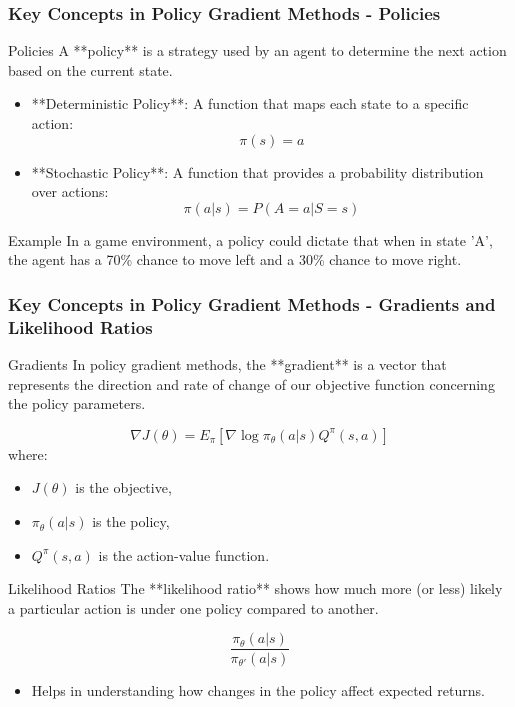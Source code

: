 \documentclass[aspectratio=169]{beamer}
\begin{document}
\begin{frame}[fragile]
    \frametitle{Key Concepts in Policy Gradient Methods - Policies}
    \begin{block}{Policies}
        A **policy** is a strategy used by an agent to determine the next action based on the current state.
    \end{block}

    \begin{itemize}
        \item **Deterministic Policy**: A function that maps each state to a specific action:
        \[
        \pi(s) = a
        \]
        \item **Stochastic Policy**: A function that provides a probability distribution over actions:
        \[
        \pi(a|s) = P(A = a | S = s)
        \]
    \end{itemize}

    \begin{block}{Example}
        In a game environment, a policy could dictate that when in state 'A', the agent has a 70\% chance to move left and a 30\% chance to move right.
    \end{block}
\end{frame}

\begin{frame}[fragile]
    \frametitle{Key Concepts in Policy Gradient Methods - Gradients and Likelihood Ratios}
    \begin{block}{Gradients}
        In policy gradient methods, the **gradient** is a vector that represents the direction and rate of change of our objective function concerning the policy parameters.
    \end{block}

    \begin{equation}
    \nabla J(\theta) = E_\pi \left[ \nabla \log \pi_\theta(a|s) Q^\pi(s, a) \right]
    \end{equation}
    where:
    \begin{itemize}
        \item \( J(\theta) \) is the objective,
        \item \( \pi_\theta(a|s) \) is the policy,
        \item \( Q^\pi(s, a) \) is the action-value function.
    \end{itemize}

    \begin{block}{Likelihood Ratios}
        The **likelihood ratio** shows how much more (or less) likely a particular action is under one policy compared to another.
    \end{block}

    \begin{equation}
    \frac{\pi_\theta(a|s)}{\pi_{\theta'}(a|s)}
    \end{equation}
    \begin{itemize}
        \item Helps in understanding how changes in the policy affect expected returns.
    \end{itemize}
\end{frame}
\end{document}
